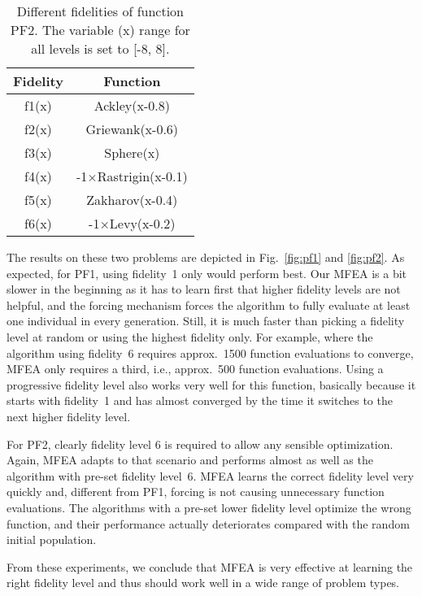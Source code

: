 \begin{table}[!htb]
	\caption{Different fidelities of function PF2. The variable (x) range for all levels is set to [-8, 8].\label{tab:PF2}}
	\begin{center}
		\begin{tabular}{c|c}
			\hline
			Fidelity&Function\\
			\hline
			f1(x)& Ackley(x-0.8)\\
			f2(x)& Griewank(x-0.6)\\
			f3(x)&  Sphere(x)\\
			f4(x)&  -1$\times$Rastrigin(x-0.1)\\
			f5(x)&  Zakharov(x-0.4)\\
			f6(x)&  -1$\times$Levy(x-0.2)\\
			\hline
		\end{tabular}
	\end{center}
\end{table}


The results on these two problems are depicted in Fig.~\ref{fig:pf1} and \ref{fig:pf2}.
As expected, for PF1, using fidelity~1 only would perform best. Our MFEA is a bit slower in the beginning as it has to learn first that higher fidelity levels are not helpful, and the forcing mechanism forces the algorithm to fully evaluate at least one individual in every generation. Still, it is much faster than picking a fidelity level at random or using the highest fidelity only. For example, where the algorithm using fidelity~6 requires approx.\ 1500 function evaluations to converge, MFEA only requires a third, i.e., approx.\ 500 function evaluations.
Using a progressive fidelity level also works very well for this function, basically because it starts with fidelity~1 and has almost converged by the time it switches to the next higher fidelity level.

For PF2, clearly fidelity level 6 is required to allow any sensible optimization. Again, MFEA adapts to that scenario and performs almost as well as the algorithm with pre-set fidelity level~6. MFEA learns the correct fidelity level very quickly and, different from PF1, forcing is not causing unnecessary function evaluations. The algorithms with a pre-set lower fidelity level optimize the wrong function, and their performance actually deteriorates compared with the random initial population. 

From these experiments, we conclude that MFEA is very effective at learning the right fidelity level and thus should work well in a wide range of problem types.



